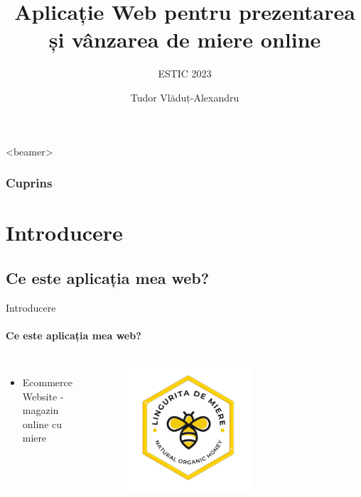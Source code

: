 \documentclass{beamer}
\title{Aplicație Web pentru prezentarea și vânzarea de miere online}
\subtitle{ESTIC 2023}
\author{Tudor Vlăduț-Alexandru}
\begin{document}
	\shorthandoff{-}
	\frame[c]{\maketitle}
	
	\begin{darkframes}
		\begin{frame}<beamer>
			\frametitle{Cuprins}
			\tableofcontents
		\end{frame}
		
		\section{Introducere}
		\subsection{Ce este aplicația mea web?}
		\begin{frame}[label=lists]{Introducere}
			\framesubtitle{Ce este aplicația mea web?}
			\begin{columns}[onlytextwidth]
				\begin{itemize}
					\item Ecommerce Website - magazin online cu miere
				\end{itemize}
				
				 \begin{figure}
					\centering
					\includegraphics[width=0.6\textwidth]{logo.png}
				\end{figure}
			\end{columns}
		\end{frame}
		
		


\end{darkframes}
\end{document}
